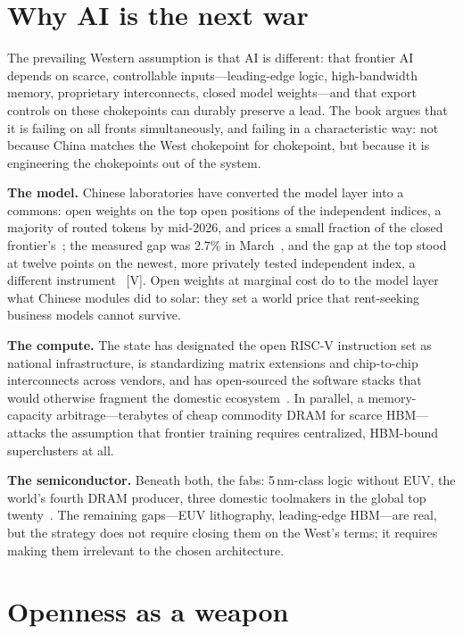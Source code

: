 \section{Why AI is the next war}

The prevailing Western assumption is that AI is different: that frontier AI depends on scarce, controllable inputs---leading-edge logic, high-bandwidth memory, proprietary interconnects, closed model weights---and that export controls on these chokepoints can durably preserve a lead. The book argues that it is failing on all fronts simultaneously, and failing in a characteristic way: not because China matches the West chokepoint for chokepoint, but because it is engineering the chokepoints out of the system.

\textbf{The model.} Chinese laboratories have converted the model layer into a commons: open weights on the top open positions of the independent indices, a majority of routed tokens by mid-2026, and prices a small fraction of the closed frontier's~\cite{hf-spring-2026}; the measured gap was 2.7\% in March~\cite{stanford-aiindex-2026}, and the gap at the top stood at twelve points on the newest, more privately tested independent index, a different instrument~\cite{mdl-aa-v5} [V]. Open weights at marginal cost do to the model layer what Chinese modules did to solar: they set a world price that rent-seeking business models cannot survive.

\textbf{The compute.} The state has designated the open RISC-V instruction set as national infrastructure, is standardizing matrix extensions and chip-to-chip interconnects across vendors, and has open-sourced the software stacks that would otherwise fragment the domestic ecosystem~\cite{riscv-policy,huawei-ub}. In parallel, a memory-capacity arbitrage---terabytes of cheap commodity DRAM for scarce HBM---attacks the assumption that frontier training requires centralized, HBM-bound superclusters at all.

\textbf{The semiconductor.} Beneath both, the fabs: 5\,nm-class logic without EUV, the world's fourth DRAM producer, three domestic toolmakers in the global top twenty~\cite{smic-5nm,cxmt-ipo}. The remaining gaps---EUV lithography, leading-edge HBM---are real, but the strategy does not require closing them on the West's terms; it requires making them irrelevant to the chosen architecture.

\section{Openness as a weapon}

